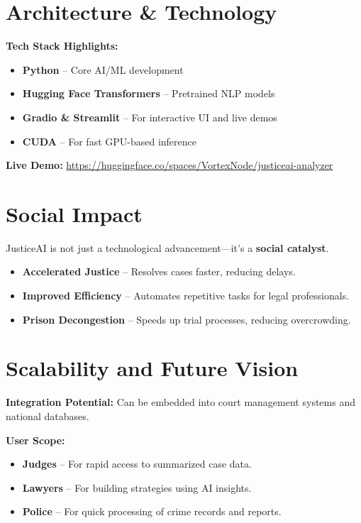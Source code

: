 \documentclass[12pt]{article}
\begin{document}
\section*{Architecture \& Technology}

\textbf{Tech Stack Highlights:}

\begin{itemize}
    \item \textbf{Python} – Core AI/ML development
    \item \textbf{Hugging Face Transformers} – Pretrained NLP models
    \item \textbf{Gradio \& Streamlit} – For interactive UI and live demos
    \item \textbf{CUDA} – For fast GPU-based inference
\end{itemize}

\textbf{Live Demo:} \url{https://huggingface.co/spaces/VortexNode/justiceai-analyzer}

\section*{Social Impact}

JusticeAI is not just a technological advancement—it’s a \textbf{social catalyst}.

\begin{itemize}
    \item \textbf{Accelerated Justice} – Resolves cases faster, reducing delays.
    \item \textbf{Improved Efficiency} – Automates repetitive tasks for legal professionals.
    \item \textbf{Prison Decongestion} – Speeds up trial processes, reducing overcrowding.
\end{itemize}

\section*{Scalability and Future Vision}

\textbf{Integration Potential:} Can be embedded into court management systems and national databases.

\textbf{User Scope:}

\begin{itemize}
    \item \textbf{Judges} – For rapid access to summarized case data.
    \item \textbf{Lawyers} – For building strategies using AI insights.
    \item \textbf{Police} – For quick processing of crime records and reports.
\end{itemize}
\end{document}
